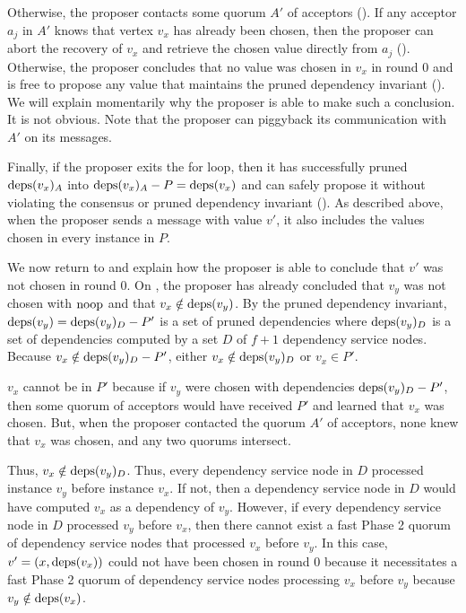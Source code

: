 Otherwise, the proposer contacts some quorum $A'$ of acceptors
(). If any acceptor $a_j$ in $A'$ knows that vertex
$v_x$ has already been chosen, then the proposer can abort the recovery of
$v_x$ and retrieve the chosen value directly from $a_j$
(). Otherwise, the proposer concludes that no value
was chosen in $v_x$ in round $0$ and is free to propose any value that
maintains the pruned dependency invariant (). We will
explain momentarily why the proposer is able to make such a conclusion. It is
not obvious. Note that the proposer can piggyback its communication with $A'$
on its  messages.

Finally, if the proposer exits the for loop, then it has successfully pruned
$\text{deps}(v_x)_A$ into $\text{deps}(v_x)_A - P = \text{deps}(v_x)$ and can safely propose it
without violating the consensus or pruned dependency invariant
().  As described above, when the proposer sends
a  message with value $v'$, it also includes the values chosen
in every instance in $P$.

We now return to  and explain how the proposer is
able to conclude that $v'$ was not chosen in round $0$. On
, the proposer has already concluded that $v_y$ was
not chosen with $\text{noop}$ and that $v_x \notin \text{deps}(v_y)$. By the pruned
dependency invariant, $\text{deps}(v_y) = \text{deps}(v_y)_{D} - P'$ is a set of pruned
dependencies where $\text{deps}(v_y)_{D}$ is a set of dependencies computed by a set
$D$ of $f+1$ dependency service nodes. Because $v_x \notin \text{deps}(v_y)_{D} -
P'$, either $v_x \notin \text{deps}(v_y)_{D}$ or $v_x \in P'$.

$v_x$ cannot be in $P'$ because if $v_y$ were chosen with dependencies
$\text{deps}(v_y)_{D} - P'$, then some quorum of acceptors would have received $P'$
and learned that $v_x$ was chosen. But, when the proposer contacted the quorum
$A'$ of acceptors, none knew that $v_x$ was chosen, and any two quorums
intersect.

Thus, $v_x \notin \text{deps}(v_y)_{D}$. Thus, every dependency service node in $D$
processed instance $v_y$ before instance $v_x$. If not, then a dependency
service node in $D$ would have computed $v_x$ as a dependency of $v_y$.
However, if every dependency service node in $D$ processed $v_y$ before $v_x$,
then there cannot exist a fast Phase 2 quorum of dependency service nodes that
processed $v_x$ before $v_y$. In this case, $v' = (x, \text{deps}(v_x))$ could not
have been chosen in round $0$ because it necessitates a fast Phase 2 quorum of
dependency service nodes processing $v_x$ before $v_y$ because $v_y \notin
\text{deps}(v_x)$.

